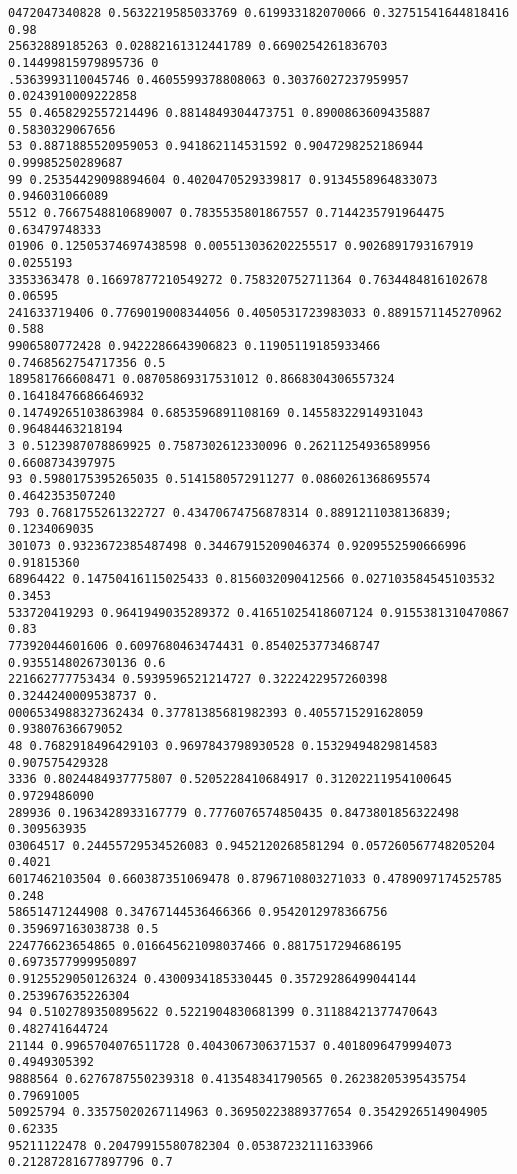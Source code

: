 \documentclass[12pt,a4paper]{article}
\begin{document}
\begin{lstlisting}
0472047340828 0.5632219585033769 0.619933182070066 0.32751541644818416 0.98
25632889185263 0.02882161312441789 0.6690254261836703 0.14499815979895736 0
.5363993110045746 0.4605599378808063 0.30376027237959957 0.0243910009222858
55 0.4658292557214496 0.8814849304473751 0.8900863609435887 0.5830329067656
53 0.8871885520959053 0.941862114531592 0.9047298252186944 0.99985250289687
99 0.25354429098894604 0.4020470529339817 0.9134558964833073 0.946031066089
5512 0.7667548810689007 0.7835535801867557 0.7144235791964475 0.63479748333
01906 0.12505374697438598 0.005513036202255517 0.9026891793167919 0.0255193
3353363478 0.16697877210549272 0.758320752711364 0.7634484816102678 0.06595
241633719406 0.7769019008344056 0.4050531723983033 0.8891571145270962 0.588
9906580772428 0.9422286643906823 0.11905119185933466 0.7468562754717356 0.5
189581766608471 0.08705869317531012 0.8668304306557324 0.16418476686646932 
0.14749265103863984 0.6853596891108169 0.14558322914931043 0.96484463218194
3 0.5123987078869925 0.7587302612330096 0.26211254936589956 0.6608734397975
93 0.5980175395265035 0.5141580572911277 0.0860261368695574 0.4642353507240
793 0.7681755261322727 0.43470674756878314 0.8891211038136839; 0.1234069035
301073 0.9323672385487498 0.34467915209046374 0.9209552590666996 0.91815360
68964422 0.14750416115025433 0.8156032090412566 0.027103584545103532 0.3453
533720419293 0.9641949035289372 0.41651025418607124 0.9155381310470867 0.83
77392044601606 0.6097680463474431 0.8540253773468747 0.9355148026730136 0.6
221662777753434 0.5939596521214727 0.3222422957260398 0.3244240009538737 0.
0006534988327362434 0.37781385681982393 0.4055715291628059 0.93807636679052
48 0.7682918496429103 0.9697843798930528 0.15329494829814583 0.907575429328
3336 0.8024484937775807 0.5205228410684917 0.31202211954100645 0.9729486090
289936 0.1963428933167779 0.7776076574850435 0.8473801856322498 0.309563935
03064517 0.24455729534526083 0.9452120268581294 0.057260567748205204 0.4021
6017462103504 0.660387351069478 0.8796710803271033 0.4789097174525785 0.248
58651471244908 0.34767144536466366 0.9542012978366756 0.359697163038738 0.5
224776623654865 0.016645621098037466 0.8817517294686195 0.6973577999950897 
0.9125529050126324 0.4300934185330445 0.35729286499044144 0.253967635226304
94 0.5102789350895622 0.5221904830681399 0.31188421377470643 0.482741644724
21144 0.9965704076511728 0.4043067306371537 0.4018096479994073 0.4949305392
9888564 0.6276787550239318 0.413548341790565 0.26238205395435754 0.79691005
50925794 0.33575020267114963 0.36950223889377654 0.3542926514904905 0.62335
95211122478 0.20479915580782304 0.05387232111633966 0.21287281677897796 0.7

\end{lstlisting}
\end{document}
